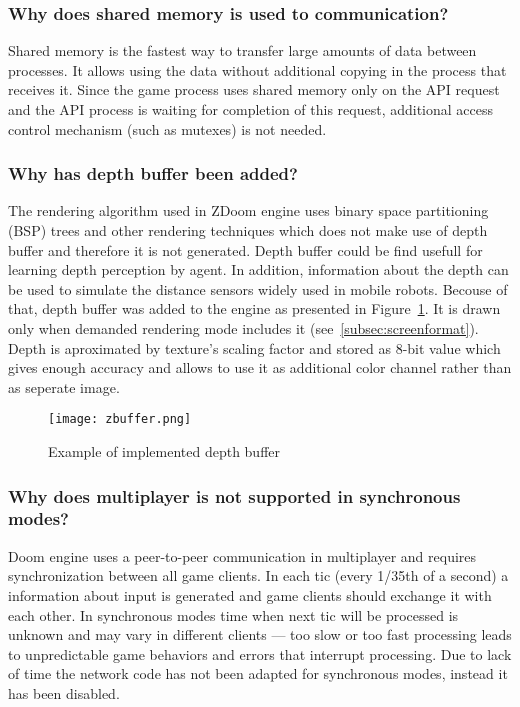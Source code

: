 \subsubsection{Why does shared memory is used to communication?}

Shared memory is the fastest way to transfer large amounts of data between processes. It allows using the data without additional copying in the process that receives it. 
Since the game process uses shared memory only on the API request and the API process is waiting for completion of this request, additional access control mechanism (such as mutexes) is not needed.

\subsubsection{Why has depth buffer been added?}

The rendering algorithm used in ZDoom engine uses binary space partitioning (BSP) trees and other rendering techniques which does not make use of depth buffer and therefore it is not generated.
Depth buffer could be find usefull for learning depth perception by agent.
In addition, information about the depth can be used to simulate the distance sensors widely used in mobile robots.  
Becouse of that, depth buffer was added to the engine as presented in Figure~\ref{fig:zbuffer}.
It is drawn only when demanded rendering mode includes it (see~\ref{subsec:screenformat}).
Depth is aproximated by texture's scaling factor and stored as 8-bit value which gives enough accuracy and allows to use it as additional color channel rather than as seperate image.

\begin{figure}
\centering
\texttt{[image: zbuffer.png]}
\caption{Example of implemented depth buffer}
\label{fig:zbuffer}
\end{figure}

\subsubsection{Why does multiplayer is not supported in synchronous modes?}\label{sec:architecture_solution_multi}

Doom engine uses a peer-to-peer communication in multiplayer and requires synchronization between all game clients. In each tic (every 1/35th of a second) a information about input is generated and game clients should exchange it with each other. 
In synchronous modes time when next tic will be processed is unknown and may vary in different clients --- too slow or too fast processing leads to unpredictable game behaviors and errors that interrupt processing. Due to lack of time the network code has not been adapted for synchronous modes, instead it has been disabled.

